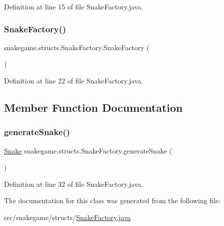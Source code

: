 Definition at line 15 of file Snake\+Factory.\+java.

\mbox{\label{classsnakegame_1_1structs_1_1_snake_factory_a057bbfab734e3434b03c8fe9b6ea7129}} 
\subsubsection{\texorpdfstring{Snake\+Factory()}{SnakeFactory()}\hspace{0.1cm}{\footnotesize\ttfamily [2/2]}}
{\footnotesize\ttfamily snakegame.\+structs.\+Snake\+Factory.\+Snake\+Factory (\begin{DoxyParamCaption}{ }\end{DoxyParamCaption})}



Definition at line 22 of file Snake\+Factory.\+java.



\subsection{Member Function Documentation}
\mbox{\label{classsnakegame_1_1structs_1_1_snake_factory_aaa009e01befdc963fbe8b920dc1ef97e}} 
\subsubsection{\texorpdfstring{generate\+Snake()}{generateSnake()}}
{\footnotesize\ttfamily \mbox{\hyperlink{classsnakegame_1_1structs_1_1_snake}{Snake}} snakegame.\+structs.\+Snake\+Factory.\+generate\+Snake (\begin{DoxyParamCaption}{ }\end{DoxyParamCaption})}



Definition at line 32 of file Snake\+Factory.\+java.



The documentation for this class was generated from the following file\+:\begin{DoxyCompactItemize}
\item 
src/snakegame/structs/\mbox{\hyperlink{_snake_factory_8java}{Snake\+Factory.\+java}}\end{DoxyCompactItemize}
